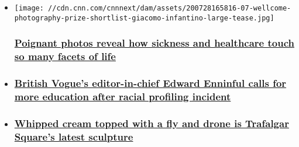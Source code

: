 \begin{itemize}
\item
  \href{/style/article/wellcome-photography-prize-shortlist-wellness/index.html}{}

  \texttt{[image: //cdn.cnn.com/cnnnext/dam/assets/200728165816-07-wellcome-photography-prize-shortlist-giacomo-infantino-large-tease.jpg]}

  \hypertarget{poignant-photos-reveal-how-sickness-and-healthcare-touch-so-many-facets-of-life}{%
  \subsubsection{\texorpdfstring{\href{/style/article/wellcome-photography-prize-shortlist-wellness/index.html}{Poignant
  photos reveal how sickness and healthcare touch so many facets of
  life}}{Poignant photos reveal how sickness and healthcare touch so many facets of life}}\label{poignant-photos-reveal-how-sickness-and-healthcare-touch-so-many-facets-of-life}}
\item
  \hypertarget{british-vogues-editor-in-chief-edward-enninful-calls-for-more-education-after-racial-profiling-incident-}{%
  \subsubsection{\texorpdfstring{\href{/style/article/edward-enninful-vogue-christiane-amanpour/index.html}{British
  Vogue's editor-in-chief Edward Enninful calls for more education after
  racial profiling incident
  }}{British Vogue's editor-in-chief Edward Enninful calls for more education after racial profiling incident }}\label{british-vogues-editor-in-chief-edward-enninful-calls-for-more-education-after-racial-profiling-incident-}}
\item
  \hypertarget{whipped-cream-topped-with-a-fly-and-drone-is-trafalgar-squares-latest-sculpture}{%
  \subsubsection{\texorpdfstring{\href{/style/article/fourth-plinth-trafalgar-square-sculpture-scli-intl-gbr/index.html}{Whipped
  cream topped with a fly and drone is Trafalgar Square's latest
  sculpture}}{Whipped cream topped with a fly and drone is Trafalgar Square's latest sculpture}}\label{whipped-cream-topped-with-a-fly-and-drone-is-trafalgar-squares-latest-sculpture}}
\end{itemize}

